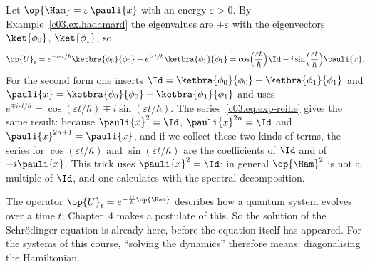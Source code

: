 \begin{example}\label{c03.ex.qubit-zeit}
  Let $\op{\Ham} = \varepsilon\, \pauli{x}$ with an energy $\varepsilon > 0$. By
  Example~\ref{c03.ex.hadamard} the eigenvalues are $\pm\varepsilon$ with the eigenvectors
  $\ket{\phi_0}$, $\ket{\phi_1}$, so
  \begin{equation}\label{c03.eq.qubit-zeit}
    \op{U}_t
    = e^{-i\varepsilon t/\hbar}\ketbra{\phi_0}{\phi_0} + e^{i\varepsilon t/\hbar}\ketbra{\phi_1}{\phi_1}
    = \cos\Bigl(\frac{\varepsilon t}{\hbar}\Bigr) \Id - i \sin\Bigl(\frac{\varepsilon t}{\hbar}\Bigr) \pauli{x} .
  \end{equation}
  For the second form one inserts $\Id = \ketbra{\phi_0}{\phi_0} + \ketbra{\phi_1}{\phi_1}$ and
  $\pauli{x} = \ketbra{\phi_0}{\phi_0} - \ketbra{\phi_1}{\phi_1}$ and uses
  $e^{\mp i\varepsilon t/\hbar} = \cos(\varepsilon t/\hbar) \mp i\sin(\varepsilon t/\hbar)$. The
  series~\eqref{c03.eq.exp-reihe} gives the same result: because $\pauli{x}^2 = \Id$,
  $\pauli{x}^{2n} = \Id$ and $\pauli{x}^{2n+1} = \pauli{x}$, and if we collect these two kinds of
  terms, the series for $\cos(\varepsilon t/\hbar)$ and $\sin(\varepsilon t/\hbar)$ are the
  coefficients of $\Id$ and of $-i\pauli{x}$. This trick uses $\pauli{x}^2 = \Id$; in general $\op{\Ham}^2$ is
  not a multiple of $\Id$, and one calculates with the spectral decomposition.
\end{example}

\begin{merksatz}
  The operator $\op{U}_t = e^{-\frac{i t}{\hbar}\op{\Ham}}$ describes how a quantum system
  evolves over a time $t$; Chapter~4 makes a postulate of this. So the solution of the
  Schrödinger equation is already here, before the equation itself has appeared. For the systems
  of this course, ``solving the dynamics'' therefore means: diagonalising the Hamiltonian.
\end{merksatz}


